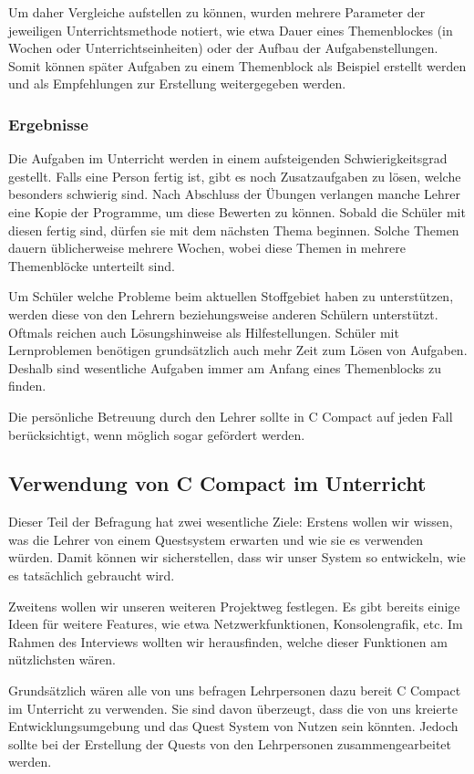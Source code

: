 Um daher Vergleiche aufstellen zu können, wurden mehrere Parameter der jeweiligen Unterrichtsmethode notiert, wie etwa Dauer eines Themenblockes (in Wochen oder Unterrichtseinheiten) oder der Aufbau der Aufgabenstellungen. Somit können später Aufgaben zu einem Themenblock als Beispiel erstellt werden und als Empfehlungen zur Erstellung weitergegeben werden.

\subsubsection*{Ergebnisse}

Die Aufgaben im Unterricht werden in einem aufsteigenden Schwierigkeitsgrad gestellt. Falls eine Person fertig ist, gibt es noch Zusatzaufgaben zu lösen, welche besonders schwierig sind. Nach Abschluss der Übungen verlangen manche Lehrer eine Kopie der Programme, um diese Bewerten zu können. Sobald die Schüler mit diesen fertig sind, dürfen sie mit dem nächsten Thema beginnen.
Solche Themen dauern üblicherweise mehrere Wochen, wobei diese Themen in mehrere Themenblöcke unterteilt sind.

Um Schüler welche Probleme beim aktuellen Stoffgebiet haben zu unterstützen, werden diese von den Lehrern beziehungsweise anderen Schülern unterstützt. Oftmals reichen auch Lösungshinweise als Hilfestellungen. Schüler mit Lernproblemen benötigen grundsätzlich auch mehr Zeit zum Lösen von Aufgaben. Deshalb sind wesentliche Aufgaben immer am Anfang eines Themenblocks zu finden.

Die persönliche Betreuung durch den Lehrer sollte in C Compact auf jeden Fall berücksichtigt, wenn möglich sogar gefördert werden.

\subsection{Verwendung von C Compact im Unterricht}
Dieser Teil der Befragung hat zwei wesentliche Ziele: Erstens wollen wir wissen, was die Lehrer von einem Questsystem erwarten und wie sie es verwenden würden. Damit können wir sicherstellen, dass wir unser System so entwickeln, wie es tatsächlich gebraucht wird.

Zweitens wollen wir unseren weiteren Projektweg festlegen. Es gibt bereits einige Ideen für weitere Features, wie etwa Netzwerkfunktionen, Konsolengrafik, etc. Im Rahmen des Interviews wollten wir herausfinden, welche dieser Funktionen am nützlichsten wären.

Grundsätzlich wären alle von uns befragen Lehrpersonen dazu bereit C Compact im Unterricht zu verwenden. Sie sind davon überzeugt, dass die von uns kreierte Entwicklungsumgebung und das Quest System von Nutzen sein könnten. Jedoch sollte bei der Erstellung der Quests von den Lehrpersonen zusammengearbeitet werden.

